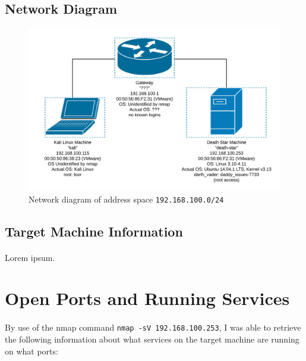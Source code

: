 \documentclass{article}
\begin{document}
\subsection{Network Diagram}
\label{subsec:network_diagram}
\begin{figure}[h!]
	\includegraphics[width=\linewidth]{resources/network-diagram.png}
	\caption{Network diagram of address space \texttt{192.168.100.0/24}}
	\label{fig:network_diagram}
\end{figure}

\subsection{Target Machine Information}
\label{subsec:target_info}
\paragraph{}
Lorem ipsum.

\newpage

\section{Open Ports and Running Services}
\label{sec:services}
\paragraph{}
By use of the nmap command \texttt{nmap -sV 192.168.100.253}, I was able to retrieve the following information about what services on the target machine are running on what ports:
\newline
\newline
\end{document}
